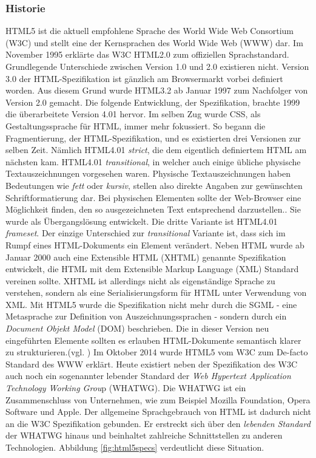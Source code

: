 \subsubsection{Historie} HTML5 ist die aktuell empfohlene Sprache des World Wide Web Consortium (W3C) und stellt eine der Kernsprachen des World Wide Web (WWW) dar. Im November 1995 erklärte das W3C HTML2.0 zum offiziellen Sprachstandard. Grundlegende Unterschiede zwischen Version 1.0 und 2.0 existieren nicht. Version 3.0 der HTML-Spezifikation ist gänzlich am Browsermarkt vorbei definiert worden. Aus diesem Grund wurde HTML3.2 ab Januar 1997 zum Nachfolger von Version 2.0 gemacht. Die folgende Entwicklung, der Spezifikation, brachte 1999 die überarbeitete Version 4.01 hervor. Im selben Zug wurde CSS, als Gestaltungssprache für HTML, immer mehr fokussiert. So begann die Fragmentierung, der HTML-Spezifikation, und es existierten drei Versionen zur selben Zeit. Nämlich HTML4.01 \textit{strict}, die dem eigentlich definiertem HTML am nächsten kam. HTML4.01 \textit{transitional}, in welcher auch einige übliche physische Textauszeichnungen vorgesehen waren. \glqq Physische Textauszeichnungen haben Bedeutungen wie \textit{fett} oder \textit{kursiv}, stellen also direkte Angaben zur gewünschten Schriftformatierung dar. Bei physischen Elementen sollte der Web-Browser eine Möglichkeit finden, den so ausgezeichneten Text entsprechend darzustellen.\grqq{}\cite{SelfHTML20141}. Sie wurde als Übergangslösung entwickelt. Die dritte Variante ist HTML4.01 \textit{frameset}. Der einzige Unterschied zur \textit{transitional} Variante ist, dass sich im Rumpf eines HTML-Dokuments ein Element verändert. Neben HTML wurde ab Januar 2000 auch eine Extensible HTML (XHTML) genannte Spezifikation entwickelt, die HTML mit dem Extensible Markup Language (XML) Standard vereinen sollte. XHTML ist allerdings nicht als eigenständige Sprache zu verstehen, sondern als eine Serialisierungsform für HTML unter Verwendung von XML. Mit HTML5 wurde die Spezifikation nicht mehr durch die SGML - eine Metasprache zur Definition von Auszeichnungssprachen - sondern durch ein \textit{Document Objekt Model} (DOM) beschrieben. Die in dieser Version neu eingeführten Elemente sollten es erlauben HTML-Dokumente semantisch klarer zu strukturieren.(vgl. \cite[S.20ff]{MunzHTML2012}) Im Oktober 2014 wurde HTML5 vom W3C zum De-facto Standard des WWW erklärt. Heute existiert neben der Spezifikation des W3C auch noch ein sogenannter \glqq lebender Standard\grqq{} der \textit{Web Hypertext Application Technology Working Grou}p (WHATWG). Die WHATWG ist ein Zusammenschluss von Unternehmen, wie zum Beispiel Mozilla Foundation, Opera Software und Apple. Der allgemeine Sprachgebrauch von HTML ist dadurch nicht an die W3C Spezifikation gebunden. Er erstreckt sich über den \textit{lebenden Standard} der WHATWG hinaus und beinhaltet zahlreiche Schnittstellen zu anderen Technologien. Abbildung \ref{fig:html5specs} verdeutlicht diese Situation.
	
